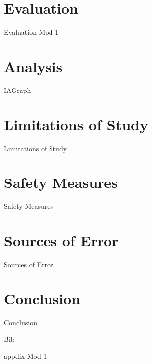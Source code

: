 \documentclass[12pt, a4paper]{article}
\begin{document}
        
        

\section{{Evaluation}}

	{Evaluation Mod 1}
        
\section{{Analysis}}
        

			{IAGraph}
        
        
        
        
\section{{Limitations of Study}}
        
        {Limitations of Study}
    
\section{{Safety Measures}}
        
        {Safety Measures} 
                
\section{{Sources of Error}}
        
        {Sources of Error}
        
\section{{Conclusion}}
        
        {Conclusion}
        

        
\clearpage

{Bib}


\clearpage

\appendix

\appendixpage

{appdix Mod 1}
\end{document}
